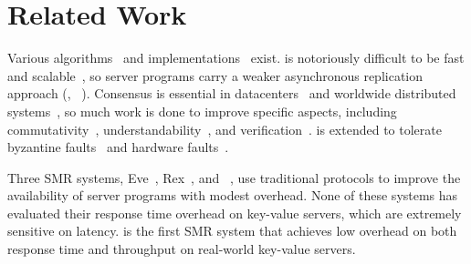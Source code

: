 \section{Related Work} \label{sec:related}


 Various
\paxos algorithms~\cite{paxos:practical,paxos,paxos:simple,paxos:complex,
epaxos:sosp13} and 
implementations~\cite{paxos:live,paxos:practical,chubby:osdi,crane:sosp15} 
exist. 
\paxos is notoriously difficult to be fast and 
scalable~\cite{ellis:thesis,manos:hotdep10,scatter:sosp11}, so server 
programs carry a weaker asynchronous replication approach (\eg, 
\redis~\cite{redis}). Consensus is essential in
datacenters~\cite{matei:hotcloud11, mesos:nsdi11, datacenter:os} and worldwide 
distributed systems~\cite{spanner:osdi12,mencius:osdi08}, so much work 
is done to improve specific aspects, 
including commutativity~\cite{epaxos:sosp13,marandi:icdcs14}, 
understandability~\cite{raft:usenix14,paxos}, and 
verification~\cite{modist:nsdi09,demeter:sosp11}. \paxos is extended to 
tolerate 
byzantine faults~\cite{brun:icdcs12,meling:icdcs12,bal:icdcs12,pbft:osdi99,
zyzzyva:sosp07,martins2013experiences,araujo2012replication,amir2010steward} and 
hardware faults~\cite{hardpaxos:srds14}.







Three SMR systems, Eve~\cite{eve:osdi12}, 
Rex~\cite{rex:eurosys14}, and \crane~\cite{crane:sosp15}, use traditional 
\paxos protocols to improve the availability of server programs with modest 
overhead. None of these systems has evaluated their response time overhead on 
key-value servers, which are extremely sensitive on latency. \xxx is the first 
SMR system that achieves low overhead on both response time and throughput on 
real-world key-value servers.

